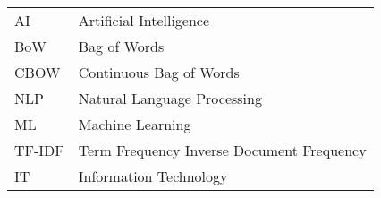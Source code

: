 \begin{longtable}{ll}

AI & Artificial Intelligence \\
BoW & Bag of Words \\
CBOW & Continuous Bag of Words \\
NLP & Natural Language Processing \\
ML & Machine Learning \\
TF-IDF & Term Frequency Inverse Document Frequency \\
IT & Information Technology \\

\end{longtable}


